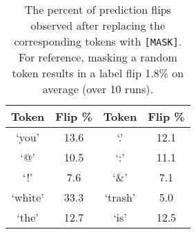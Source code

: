 \documentclass[11pt]{article}
\begin{document}
\begin{table}
\small
\centering
\begin{tabular}{cc|cc}
\toprule
\bf Token& \bf Flip \%&\bf Token& \bf Flip \%\\
\midrule
`you'&13.6&`.'&12.1\\
`@'&10.5&`:'&11.1\\
`!'&7.6&`\&'&7.1\\
`white'&33.3&`trash'&5.0\\
`the'&12.7&`is'&12.5\\
\bottomrule
\end{tabular}
\caption{The percent of prediction flips observed after replacing the corresponding tokens with {\tt[MASK]}. For reference, masking a random token results in a label flip 1.8\% on average (over 10 runs).}
\label{tab:hate}
    \minipostspace{}
\end{table}

\end{document}

